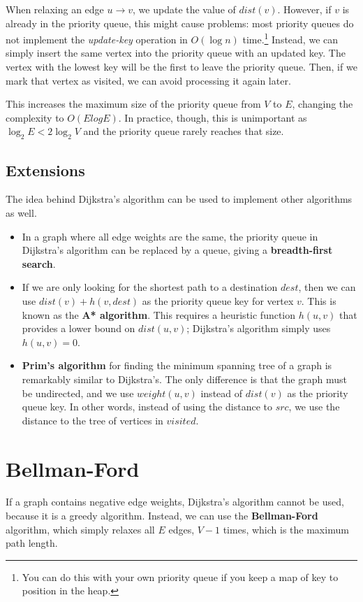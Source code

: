 \documentclass{article}
\begin{document}
When relaxing an edge $u \rightarrow v$, we update the value of $dist(v)$. However, if $v$ is already in the priority queue, this might cause problems: most priority queues do not implement the \textit{update-key} operation in $O(\log{n})$ time.\footnote{You can do this with your own priority queue if you keep a map of key to position in the heap.} Instead, we can simply insert the same vertex into the priority queue with an updated key. The vertex with the lowest key will be the first to leave the priority queue. Then, if we mark that vertex as visited, we can avoid processing it again later.

This increases the maximum size of the priority queue from $V$ to $E$, changing the complexity to $O(E log E)$. In practice, though, this is unimportant as $\log_2 E < 2 \log_2 V$ and the priority queue rarely reaches that size.


\subsection{Extensions}

The idea behind Dijkstra's algorithm can be used to implement other algorithms as well.

\begin{itemize}
    \item In a graph where all edge weights are the same, the priority queue in Dijkstra's algorithm can be replaced by a queue, giving a \textbf{breadth-first search}.

    \item If we are only looking for the shortest path to a destination $dest$, then we can use $dist(v)+h(v,dest)$ as the priority queue key for vertex $v$. This is known as the \textbf{A* algorithm}. This requires a heuristic function $h(u,v)$ that provides a lower bound on $dist(u,v)$; Dijkstra's algorithm simply uses $h(u,v)=0$.

    \item \textbf{Prim's algorithm} for finding the minimum spanning tree of a graph is remarkably similar to Dijkstra's. The only difference is that the graph must be undirected, and we use $weight(u,v)$ instead of $dist(v)$ as the priority queue key. In other words, instead of using the distance to $src$, we use the distance to the tree of vertices in $visited$.
\end{itemize}


\section{Bellman-Ford}
If a graph contains negative edge weights, Dijkstra's algorithm cannot be used, because it is a greedy algorithm. Instead, we can use the \textbf{Bellman-Ford} algorithm, which simply relaxes all $E$ edges, $V-1$ times, which is the maximum path length.
\end{document}
